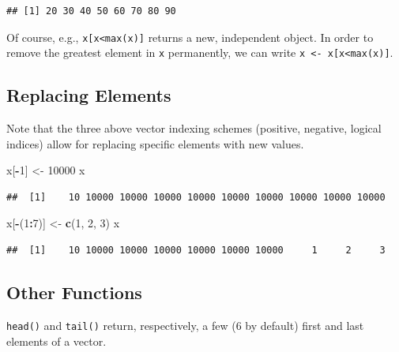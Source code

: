 \documentclass[10pt,b5paper,krantz1]{krantz}
\newenvironment{Shaded}{\begin{snugshade}}{\end{snugshade}}
\newcommand{\DecValTok}[1]{\textcolor[rgb]{0.06,0.06,0.06}{#1}}
\newcommand{\KeywordTok}[1]{\textcolor[rgb]{0.27,0.27,0.27}{\textbf{#1}}}
\newcommand{\NormalTok}[1]{#1}
\newcommand{\OperatorTok}[1]{\textcolor[rgb]{0.43,0.43,0.43}{\textbf{#1}}}
\newcommand{\StringTok}[1]{\textcolor[rgb]{0.5,0.5,0.5}{#1}}
\begin{document}
\begin{verbatim}
## [1] 20 30 40 50 60 70 80 90
\end{verbatim}

Of course, e.g., \texttt{x{[}x\textless{}max(x){]}} returns a new, independent object.
In order to remove the greatest element in \texttt{x} permanently, we can write
\texttt{x\ \textless{}-\ x{[}x\textless{}max(x){]}}.

\hypertarget{replacing-elements}{%
\subsection{Replacing Elements}\label{replacing-elements}}

Note that the three above vector indexing schemes (positive,
negative, logical indices) allow for replacing specific elements with new
values.

\begin{Shaded}
\begin{Highlighting}[]
\NormalTok{x[}\OperatorTok{-}\DecValTok{1}\NormalTok{] <-}\StringTok{ }\DecValTok{10000}
\NormalTok{x}
\end{Highlighting}
\end{Shaded}

\begin{verbatim}
##  [1]    10 10000 10000 10000 10000 10000 10000 10000 10000 10000
\end{verbatim}

\begin{Shaded}
\begin{Highlighting}[]
\NormalTok{x[}\OperatorTok{-}\NormalTok{(}\DecValTok{1}\OperatorTok{:}\DecValTok{7}\NormalTok{)] <-}\StringTok{ }\KeywordTok{c}\NormalTok{(}\DecValTok{1}\NormalTok{, }\DecValTok{2}\NormalTok{, }\DecValTok{3}\NormalTok{)}
\NormalTok{x}
\end{Highlighting}
\end{Shaded}

\begin{verbatim}
##  [1]    10 10000 10000 10000 10000 10000 10000     1     2     3
\end{verbatim}

\hypertarget{other-functions}{%
\subsection{Other Functions}\label{other-functions}}

\texttt{head()} and \texttt{tail()} return, respectively, a few (6 by default) first and last elements
of a vector.
\end{document}
